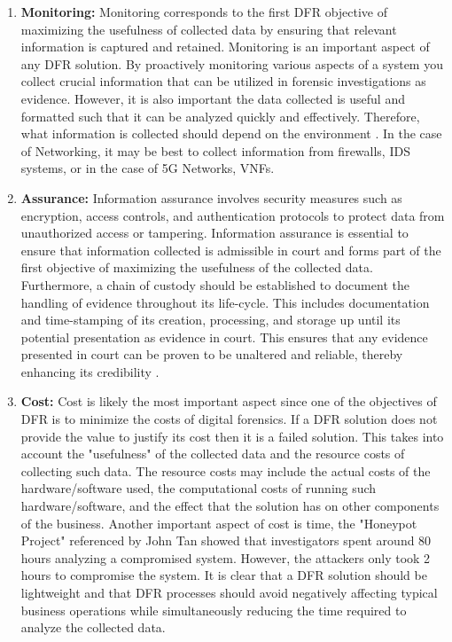 \documentclass[final,1p,times,authoryear]{elsarticle}
\begin{document}
\begin{enumerate}[label=\thesubsection.\arabic*]
	\item \textbf{Monitoring:}
Monitoring corresponds to the first DFR objective of maximizing the usefulness of collected data by ensuring that relevant information is captured and retained. Monitoring is an important aspect of any DFR solution. By proactively monitoring various aspects of a system you collect crucial information that can be utilized in forensic investigations as evidence. However, it is also important the data collected is useful and formatted such that it can be analyzed quickly and effectively. Therefore, what information is collected should depend on the environment \citep{tan2001forensic}. In the case of Networking, it may be best to collect information from firewalls, IDS systems, or in the case of 5G Networks, VNFs.

	\item \textbf{Assurance:}
Information assurance involves security measures such as encryption, access controls, and authentication protocols to protect data from unauthorized access or tampering. Information assurance is essential to ensure that information collected is admissible in court \citep{9089494} and forms part of the first objective of maximizing the usefulness of the collected data. Furthermore, a chain of custody should be established to document the handling of evidence throughout its life-cycle. This includes documentation and time-stamping of its creation, processing, and storage up until its potential presentation as evidence in court. This ensures that any evidence presented in court can be proven to be unaltered and reliable, thereby enhancing its credibility \citep{tan2001forensic}.

	\item \textbf{Cost:}
Cost is likely the most important aspect since one of the objectives of DFR is to minimize the costs of digital forensics. If a DFR solution does not provide the value to justify its cost then it is a failed solution. This takes into account the "usefulness" of the collected data and the resource costs of collecting such data. The resource costs may include the actual costs of the hardware/software used, the computational costs of running such hardware/software, and the effect that the solution has on other components of the business. Another important aspect of cost is time, the "Honeypot Project" referenced by John Tan \citep{tan2001forensic} showed that investigators spent around 80 hours analyzing a compromised system. However, the attackers only took 2 hours to compromise the system. It is clear that a DFR solution should be lightweight and that DFR processes should avoid negatively affecting typical business operations while simultaneously reducing the time required to analyze the collected data.


\end{enumerate}
\end{document}
